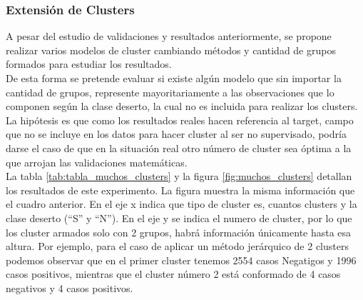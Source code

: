 \subsubsection{\textbf{Extensión de Clusters}}

A pesar del estudio de validaciones y resultados anteriormente,
se propone realizar varios modelos de cluster cambiando métodos y cantidad de grupos formados para estudiar los resultados. \\
De esta forma se pretende evaluar si existe algún modelo que sin importar la cantidad de grupos, represente mayoritariamente a las observaciones que lo componen según la clase deserto, la cual no es incluida para realizar los clusters.\\
La hipótesis es que como los resultados reales hacen referencia al target,
campo que no se incluye en los datos para hacer cluster al ser no
supervisado, podría darse el caso de que en la situación real otro
número de cluster sea óptima a la que arrojan las validaciones
matemáticas.\\

La tabla \ref{tab:tabla_muchos_clusters} y la figura \ref{fig:muchos_clusters} detallan los resultados de este experimento. La figura muestra la misma información que el cuadro anterior. En el eje
x indica que tipo de cluster es, cuantos clusters y la clase deserto
(``S'' y ``N''). En el eje y se indica el numero de cluster, por lo que
los cluster armados solo con 2 grupos, habrá información únicamente
hasta esa altura. Por ejemplo, para el caso de aplicar un método
jerárquico de 2 clusters podemos observar que en el primer cluster
tenemos 2554 casos Negatigos y 1996 casos positivos, mientras que el
cluster número 2 está conformado de 4 casos negativos y 4 casos
positivos.


